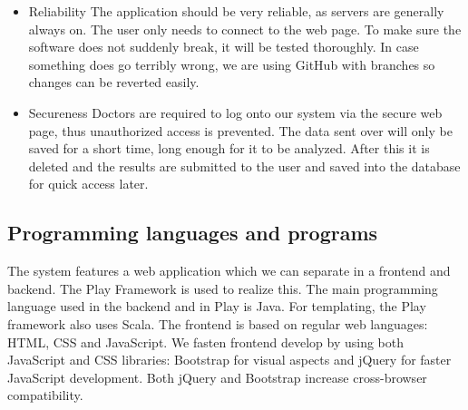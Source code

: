 \begin{itemize}
		\item Reliability
			\subitem The application should be very reliable, as servers are generally always on. The user only needs to connect to the web page. To make sure the software does not suddenly break, it will be tested thoroughly. In case something does go terribly wrong, we are using GitHub with branches so changes can be reverted easily.
		\item Secureness
			\subitem Doctors are required to log onto our system via the secure web page, thus unauthorized access is prevented. The data sent over will only be saved for a short time, long enough for it to be analyzed. After this it is deleted and the results are submitted to the user and saved into the database for quick access later.
	\end{itemize}
	\subsection{Programming languages and programs}
	The system features a web application which we can separate in a frontend and backend. The Play Framework is used to realize this. The main programming language used in the backend and in Play is Java. For templating, the Play framework also uses Scala. The frontend is based on regular web languages: HTML, CSS and JavaScript. We fasten frontend develop by using both JavaScript and CSS libraries: Bootstrap for visual aspects and jQuery for faster JavaScript development. Both jQuery and Bootstrap increase cross-browser compatibility.